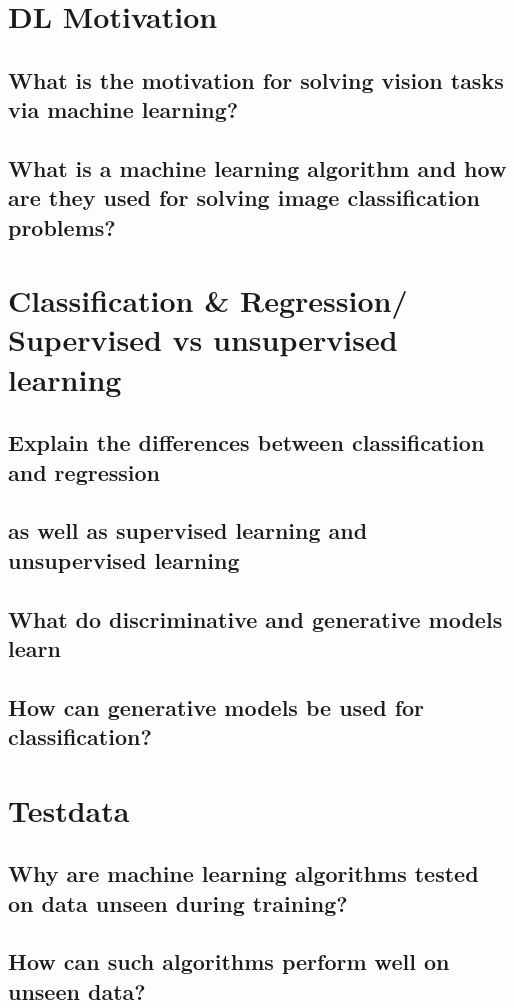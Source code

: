 \section{DL Motivation}
\subsection{What is the motivation for solving vision tasks via machine learning?}
\subsection{What is a machine learning algorithm and how are they used for solving image classification problems?}

\section{Classification \& Regression/ Supervised vs unsupervised learning}
\subsection{Explain the differences between classification and regression }
\subsection{as well as supervised learning and unsupervised learning }
\subsection{What do discriminative and generative models learn }
\subsection{How can generative models be used for classification?}

\section{Testdata}
\subsection{Why are machine learning algorithms tested on data unseen during training?}
\subsection{How can such algorithms perform well on unseen data?}
